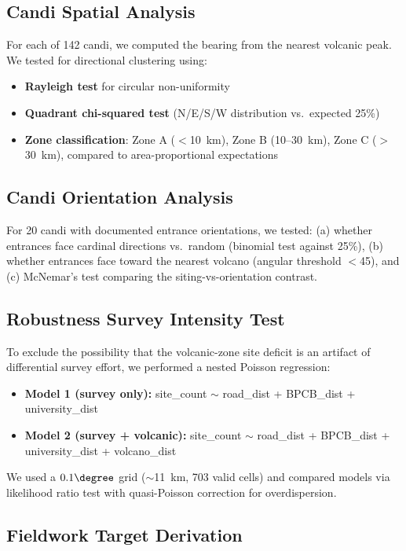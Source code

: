 \documentclass[12pt,a4paper]{article}
\begin{document}
\subsection{Candi Spatial Analysis}
\label{sec:spatial}

For each of 142 candi, we computed the bearing from the nearest volcanic peak. We tested for directional clustering using:
\begin{itemize}
    \item \textbf{Rayleigh test} for circular non-uniformity
    \item \textbf{Quadrant chi-squared test} (N/E/S/W distribution vs.\ expected 25\%)
    \item \textbf{Zone classification}: Zone A ($<$10~km), Zone B (10--30~km), Zone C ($>$30~km), compared to area-proportional expectations
\end{itemize}

\subsection{Candi Orientation Analysis}
\label{sec:orientation}

For 20 candi with documented entrance orientations, we tested: (a) whether entrances face cardinal directions vs.\ random (binomial test against 25\%), (b) whether entrances face toward the nearest volcano (angular threshold $<$45\textdegree), and (c) McNemar's test comparing the siting-vs-orientation contrast.

\subsection{Robustness Survey Intensity Test}
\label{sec:adv3}

To exclude the possibility that the volcanic-zone site deficit is an artifact of differential survey effort, we performed a nested Poisson regression:
\begin{itemize}
    \item \textbf{Model 1 (survey only):} site\_count $\sim$ road\_dist + BPCB\_dist + university\_dist
    \item \textbf{Model 2 (survey + volcanic):} site\_count $\sim$ road\_dist + BPCB\_dist + university\_dist + volcano\_dist
\end{itemize}
We used a $0.1\degree$ grid ($\sim$11~km, 703 valid cells) and compared models via likelihood ratio test with quasi-Poisson correction for overdispersion.

\subsection{Fieldwork Target Derivation}
\label{sec:targets}
\end{document}
